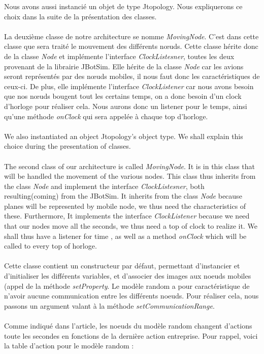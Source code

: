Nous avons aussi instancié un objet de type Jtopology. Nous expliquerons ce choix dans la suite de la présentation des classes.\\\\
La deuxième classe de notre architecture se nomme \textit{MovingNode}. C'est dans cette classe que sera traité le mouvement des différents nœuds. Cette classe hérite donc de la classe \textit{Node} et implémente l'interface \textit{ClockListesner}, toutes les deux provenant de la librairie JBotSim. Elle hérite de la classe \textit{Node} car les avions seront représentés par des nœuds mobiles, il nous faut donc les caractéristiques de ceux-ci. De plus, elle implémente l'interface \textit{ClockListener} car nous avons besoin que nos nœuds bougent tout les certains temps, on a donc besoin d'un clock d'horloge pour réaliser cela. Nous aurons donc un listener pour le temps, ainsi qu'une méthode \textit{onClock} qui sera appelée à chaque top d'horloge.\\\\

We also instantiated an object Jtopology's object type. We shall explain this choice during the presentation of classes. \\\\
The second class of our architecture is called \textit{MovingNode}. It is in this class that will be handled the movement of the various nodes. This class thus inherits from the class \textit{Node} and implement the interface \textit{ClockListesner}, both resulting(coming) from the JBotSim. It inherits from the class \textit{Node} because planes will be represented by mobile node, we thus need the characteristics of these. Furthermore, It implements the interface \textit{ClockListener} because we need that our nodes move all the seconds, we thus need a top of clock to realize it. We shall thus have a listener for time , as well as a method \textit{onClock} which will be called to every top of horloge. \\\\


Cette classe contient un constructeur par défaut, permettant d'instancier et d'initialiser les différents variables, et d'associer des images aux noeuds mobiles (appel de la méthode \textit{setProperty}. Le modèle random a pour caractéristique de n'avoir aucune communication entre les différents noeuds. Pour réaliser cela, nous passons un argument valant  à la méthode \textit{setCommunicationRange}.\\\\
Comme indiqué dans l'article, les noeuds du modèle random changent d'actions toute les secondes en fonctions de la dernière action entreprise. Pour rappel, voici la table d'action pour le modèle random : \\\\


